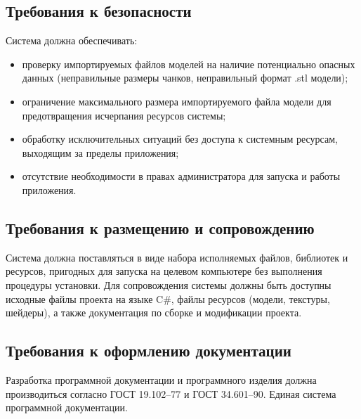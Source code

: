 \subsection{Требования к безопасности}
Система должна обеспечивать:
\begin{itemize}
	\item проверку импортируемых файлов моделей на наличие потенциально опасных данных (неправильные размеры чанков, неправильный формат .stl модели);
	\item ограничение максимального размера импортируемого файла модели для предотвращения исчерпания ресурсов системы;
	\item обработку исключительных ситуаций без доступа к системным ресурсам, выходящим за пределы приложения;
	\item отсутствие необходимости в правах администратора для запуска и работы приложения.
\end{itemize}

\subsection{Требования к размещению и сопровождению}
Система должна поставляться в виде набора исполняемых файлов, библиотек и ресурсов, пригодных для запуска на целевом компьютере без выполнения процедуры установки. Для сопровождения системы должны быть доступны исходные файлы проекта на языке C\#, файлы ресурсов (модели, текстуры, шейдеры), а также документация по сборке и модификации проекта.

\subsection{Требования к оформлению документации}
Разработка программной документации и программного изделия должна производиться согласно ГОСТ 19.102–77 и ГОСТ 34.601–90. Единая система программной документации.

